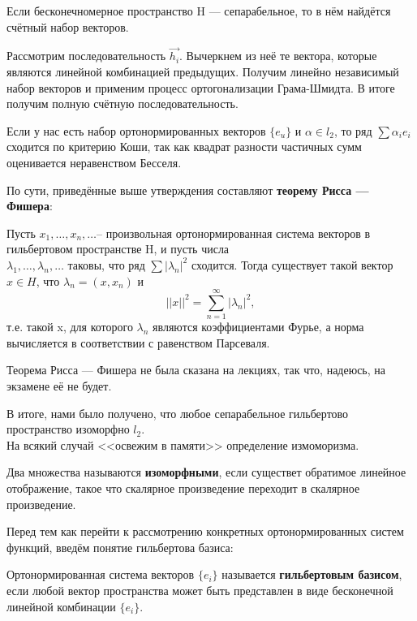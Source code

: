 	Если бесконечномерное пространство H --- сепарабельное, то в нём найдётся счётный набор векторов.
	
	Рассмотрим последовательность $\vec{h_i}$. Вычеркнем из неё те вектора, которые являются линейной комбинацией предыдущих.
	Получим линейно независимый набор векторов и применим процесс ортогонализации Грама-Шмидта. В итоге получим полную счётную 
	последовательность.
	
	Если у нас есть набор ортонормированных векторов $\{ e_u \}$ и $\alpha \in l_2$, то ряд $\sum \alpha_i e_i$ сходится по 
	критерию Коши, так как квадрат разности частичных сумм оценивается неравенством Бесселя.
	
	По сути, приведённые выше утверждения составляют \textbf{теорему Рисса --- Фишера}:
	\begin{theorem}
		Пусть $x_1, \dots ,x_n, \dots $-- произвольная ортонормированная система векторов в гильбертовом пространстве H, и пусть 
		числа \\
		$\lambda _1, \dots ,\lambda _n, \dots $ таковы, что ряд $\sum |\lambda_n|^2$ сходится. Тогда существует такой 
		вектор $x\in H$, что $\lambda _n=(x,x_n)$ и
		\begin{displaymath}
			\vert\vert x\vert\vert ^2=\sum_{n=1}^{\infty } \vert\lambda _n\vert^2,
		\end{displaymath}
		т.е. такой x, для которого $\lambda _n$ являются коэффициентами Фурье, а норма вычисляется в 
		соответствии с равенством Парсеваля. 
	\end{theorem}
	{\color{red} Теорема Рисса --- Фишера не была сказана на лекциях, так что, надеюсь, на экзамене её не будет.}
	
	В итоге, нами было получено, что любое сепарабельное гильбертово пространство изоморфно $l_2$. \\
	На всякий случай <<освежим в памяти>> определение измоморизма.
	\begin{defi}
		Два множества называются \textbf{изоморфными}, если существет обратимое линейное отображение, такое что скалярное
		произведение переходит в скалярное произведение.
	\end{defi}
	
	Перед тем как перейти к рассмотрению конкретных ортонормированных систем функций, введём понятие гильбертова базиса:
	\begin{defi}
		Ортонормированная система векторов $\{ e_i \}$ называется \textbf{гильбертовым базисом}, если любой вектор
		пространства может быть представлен в виде бесконечной линейной комбинации $ \{ e_i \} $.
	\end{defi}
	
